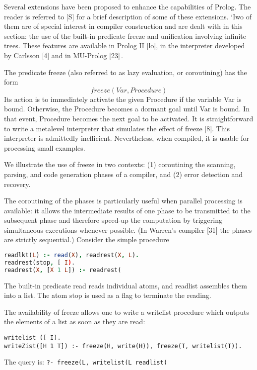 \label{cohen9}\secdown

Several extensions have been proposed to enhance the capabilities of Prolog. The
reader is referred to [S] for a brief description of some of these extensions. ‘Iwo
of them are of special interest in compiler construction and are dealt with in this
section: the use of the built-in predicate freeze and unification involving infinite
trees. These features are available in Prolog II [lo], in the interpreter developed
by Carlsson [4] and in MU-Prolog [23]\,.

The predicate freeze (also referred to as lazy evaluation, or coroutining) has
the form
\[freeze ( Var, Procedure)\]
Its action is to immediately activate the given Procedure if the variable Var is
bound. Otherwise, the Procedure becomes a dormant goal until Var is bound. In
that event, Procedure becomes the next goal to be activated. It is straightforward
to write a metalevel interpreter that simulates the effect of freeze [8]. This
interpreter is admittedly inefficient. Nevertheless, when compiled, it is usable
for processing small examples. 

We illustrate the use of freeze in two contexts: (1) coroutining the scanning,
parsing, and code generation phases of a compiler, and (2) error detection and
recovery. 

The coroutining of the phases is particularly useful when parallel processing
is available: it allows the intermediate results of one phase to be transmitted to 
the subsequent phase and therefore speed-up the computation by triggering
simultaneous executions whenever possible. (In Warren’s compiler [31] the
phases are strictly sequential.) Consider the simple procedure
\begin{lstlisting}[language=prolog]
readlkt(L) :- read(X), readrest(X, L).
readrest(stop, [ I).
readrest(X, [X 1 L]) :- readrest(  
\end{lstlisting}
The built-in predicate read reads individual atoms, and readlist assembles them
into a list. The atom stop is used as a flag to terminate the reading. 

The availability of freeze allows one to write a writelist procedure which outputs
the elements of a list as soon as they are read:
\begin{verbatim}
writelist ([ I).
writeZist([H 1 T]) :- freeze(H, write(H)), freeze(T, writelist(T)).
\end{verbatim}
The query is: \verb|?- freeze(L, writelist(L readlist(|


